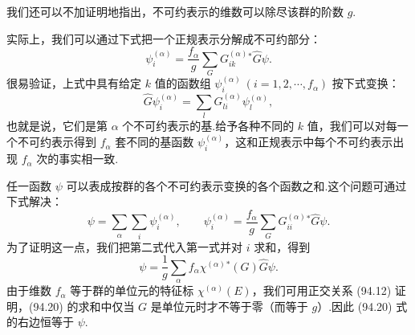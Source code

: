 我们还可以不加证明地指出，不可约表示的维数可以除尽该群的阶数 $g$.

实际上，我们可以通过下式把一个正规表示分解成不可约部分：
\begin{equation}
  \psi_i^{(\alpha)}=\frac{f_\alpha}{g}\sum_G G_{ik}^{(\alpha)}{}^{*}\hat{G}\psi.
\end{equation}
很易验证，上式中具有给定 $k$ 值的函数组 $\psi_i^{(\alpha)}\ (i=1,2,\cdots,f_\alpha)$ 按下式变换：
\begin{equation*}
  \hat{G}\psi_i^{(\alpha)}=\sum_l G_{li}^{(\alpha)}\psi_l^{(\alpha)},
\end{equation*}
也就是说，它们是第 $\alpha$ 个不可约表示的基.给予各种不同的 $k$ 值，我们可以对每一个不可约表示得到 $f_\alpha$ 套不同的基函数 $\psi_i^{(\alpha)}$，这和正规表示中每个不可约表示出现 $f_\alpha$ 次的事实相一致.

任一函数 $\psi$ 可以表成按群的各个不可约表示变换的各个函数之和.这个问题可通过下式解决：
\begin{equation}
  \psi=\sum_\alpha\sum_i\psi_i^{(\alpha)},\qquad
  \psi_i^{(\alpha)}=\frac{f_\alpha}{g}\sum_G G_{ii}^{(\alpha)}{}^{*}\hat{G}\psi.
\end{equation}
为了证明这一点，我们把第二式代入第一式并对 $i$ 求和，得到
\begin{equation}
  \psi=\frac{1}{g}\sum_\alpha f_\alpha\chi^{(\alpha)}{}^{*}(G)\hat{G}\psi.
\end{equation}
由于维数 $f_\alpha$ 等于群的单位元的特征标 $\chi^{(\alpha)}(E)$，我们可用正交关系 (94.12) 证明，(94.20) 的求和中仅当 $G$ 是单位元时才不等于零（而等于 $g$）.因此 (94.20) 式的右边恒等于 $\psi$.


